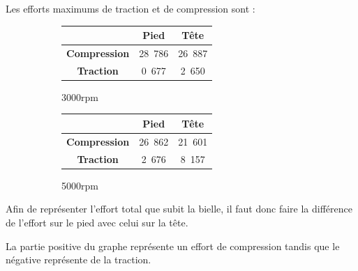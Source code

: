 \documentclass{article}
\begin{document}
Les efforts maximums de traction et de compression sont :

\begin{figure}[h]
\centering
    \begin{subfigure}[b]{0.45\textwidth}
    		\begin{tabular}{|c|c|c|}
		\hline 
  		& \textbf{Pied} & \textbf{Tête} \\ 
		\hline 
		\textbf{Compression} & \unit{28.786}{ \kilo\newton} & \unit{26.887}{\kilo\newton} \\ 
		\hline 
		\textbf{Traction} & \unit{0.677}{ \kilo\newton} & \unit{2.650}{ \kilo\newton} \\ 
		\hline 
		\end{tabular}
		\caption{\unit{3000}{rpm}}
    \end{subfigure}
    \begin{subfigure}[b]{0.45\textwidth}
        	\begin{tabular}{|c|c|c|}
		\hline 
  		& \textbf{Pied} & \textbf{Tête} \\ 
		\hline 
		\textbf{Compression} & \unit{26.862}{ \kilo\newton} & \unit{21.601}{ \kilo\newton}\\ 
		\hline 
		\textbf{Traction} & \unit{2.676}{ \kilo\newton} & \unit{8.157}{\kilo\newton} \\ 
		\hline 
		\end{tabular} 	
		\caption{\unit{5000}{rpm}}	
    \end{subfigure}
    \caption{}
\end{figure}

Afin de représenter l'effort total que subit la bielle, il faut donc faire la différence de l'effort sur le pied avec celui sur la tête.

La partie positive du graphe représente un effort de compression tandis que le négative représente de la traction.
\end{document}
